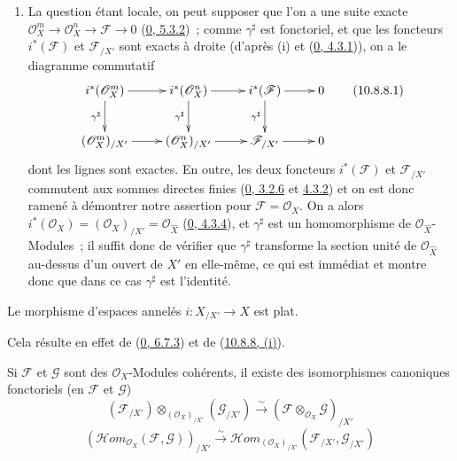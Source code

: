 \begin{enumerate}
  \item[\rm{(ii)}] La question étant locale, on peut supposer que l'on a
    une suite exacte
    $\mathscr{O}_X^m\to\mathscr{O}_X^n\to\mathscr{F}\to0$
    (\hyperref[0.5.3.2-fr]{0, 5.3.2})~; comme $\gamma^\sharp$ est
    fonctoriel, et que les foncteurs $i^*(\mathscr{F})$ et
    $\mathscr{F}_{/X'}$ sont exacts à droite (d'après (i) et
    (\hyperref[0.4.3.1-fr]{0, 4.3.1})), on a le diagramme commutatif
    \[
      \xymatrix{
        i^*(\mathscr{O}_X^m)\ar[r]\ar[d]_{\gamma^\sharp} &
        i^*(\mathscr{O}_X^n)\ar[r]\ar[d]_{\gamma^\sharp} &
        i^*(\mathscr{F})\ar[r]\ar[d]_{\gamma^\sharp} &
        0\\
        (\mathscr{O}_X^m)_{/X'}\ar[r] &
        (\mathscr{O}_X^n)_{/X'}\ar[r] &
        \mathscr{F}_{/X'}\ar[r] &
        0
      }
      \tag{10.8.8.1}\label{I.10.8.8.1-fr}
    \]
    dont les lignes sont exactes. En outre, les deux foncteurs
    $i^*(\mathscr{F})$ et $\mathscr{F}_{/X'}$ commutent aux sommes
    directes finies (\hyperref[0.3.2.6-fr]{0, 3.2.6} et
    \hyperref[0.4.3.2-fr]{4.3.2}) et on est donc ramené à démontrer notre
    assertion pour $\mathscr{F}=\mathscr{O}_X$. On a alors
    $i^*(\mathscr{O}_X)=(\mathscr{O}_X)_{/X'}=
    \mathscr{O}_{\widehat X}$
    (\hyperref[0.4.3.4-fr]{0, 4.3.4}), et $\gamma^\sharp$ est un
    homomorphisme de $\mathscr{O}_{\widehat X}$-Modules~; il suffit donc
    de vérifier que $\gamma^\sharp$ transforme la section unité de
    $\mathscr{O}_{\widehat X}$ au-dessus d'un ouvert de $X'$ en elle-même,
    ce qui est immédiat et montre donc que dans ce cas $\gamma^\sharp$ est
    l'identité.
\end{enumerate}

\begin{corollary}[10.8.9]
\label{I.10.8.9-fr}
Le morphisme d'espaces annelés $i:X_{/X'}\to X$ est plat.
\end{corollary}

Cela résulte en effet de (\hyperref[0.6.7.3-fr]{0, 6.7.3}) et de
(\hyperref[I.10.8.8-fr]{10.8.8, (i)}).

\begin{corollary}[10.8.10]
\label{I.10.8.10-fr}
Si $\mathscr{F}$ et $\mathscr{G}$ sont des $\mathscr{O}_X$-Modules
cohérents, il existe des isomorphismes canoniques fonctoriels (en
$\mathscr{F}$ et $\mathscr{G}$)
\[
  (\mathscr{F}_{/X'})\otimes_{(\mathscr{O}_X)_{/X'}}
  (\mathscr{G}_{/X'})
  \xrightarrow{\sim}
  (\mathscr{F}\otimes_{\mathscr{O}_X}\mathscr{G})_{/X'}
  \tag{10.8.10.1}\label{I.10.8.10.1-fr}
\]
\[
  (\mathscr{H}\!om_{\mathscr{O}_X}(\mathscr{F},\mathscr{G}))_{/X'}
  \xrightarrow{\sim}
  \mathscr{H}\!om_{(\mathscr{O}_X)_{/X'}}
  (\mathscr{F}_{/X'},\mathscr{G}_{/X'})
  \tag{10.8.10.2}\label{I.10.8.10.2-fr}
\]
\end{corollary}

